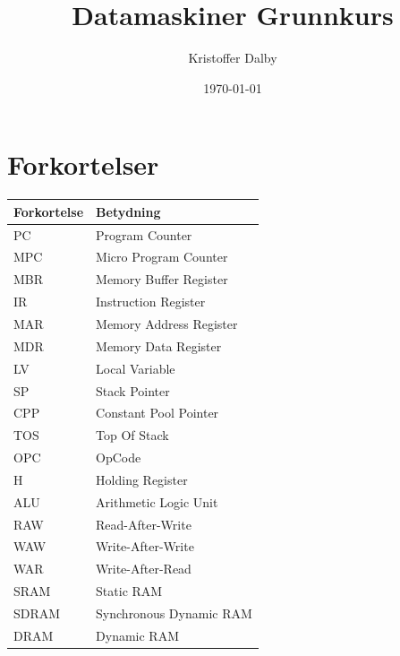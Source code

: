 \documentclass[a4paper, 10pt]{article}
\title{Datamaskiner Grunnkurs}
\author{Kristoffer Dalby}
\date{\today}
\begin{document}
\maketitle

\thispagestyle{empty}
\newpage
{}
\setcounter{page}{1}

\section{Forkortelser}
 \begin{tabular}{|l|l|}
    \hline
    Forkortelse & Betydning                        \\ \hline
    PC          & Program Counter                  \\ \hline
    MPC         & Micro Program Counter            \\ \hline
    MBR         & Memory Buffer Register           \\ \hline
    IR          & Instruction Register             \\ \hline
    MAR         & Memory Address Register          \\ \hline
    MDR         & Memory Data Register             \\ \hline
    LV          & Local Variable                   \\ \hline
    SP          & Stack Pointer                    \\ \hline
    CPP         & Constant Pool Pointer            \\ \hline
    TOS         & Top Of Stack                     \\ \hline
    OPC         & OpCode                           \\ \hline
    H           & Holding Register                 \\ \hline
    ALU         & Arithmetic Logic Unit            \\ \hline
    RAW         & Read-After-Write                 \\ \hline
    WAW         & Write-After-Write                \\ \hline
    WAR         & Write-After-Read                 \\ \hline
    SRAM        & Static RAM                       \\ \hline
    SDRAM       & Synchronous Dynamic RAM          \\ \hline
    DRAM        & Dynamic RAM                      \\ \hline

\end{tabular}
\end{document}
